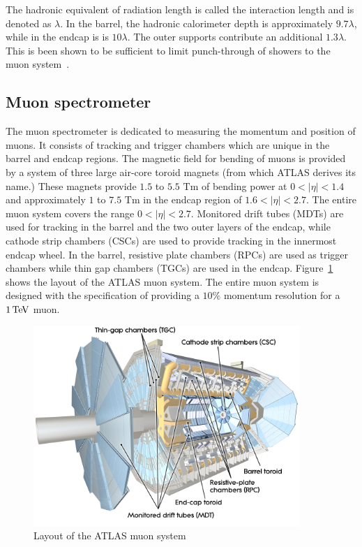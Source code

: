 The hadronic equivalent of radiation length is called the interaction length and is denoted as $\lambda$. In the barrel, the hadronic calorimeter depth is approximately $9.7\lambda$, while in the endcap is is $10\lambda$. The outer supports contribute an additional $1.3\lambda$. This is been shown to be sufficient to limit punch-through of showers to the muon system~\cite{ATLASPaper}.

\subsection{Muon spectrometer}

The muon spectrometer is dedicated to measuring the momentum and position of muons. It consists of tracking and trigger chambers which are unique in the barrel and endcap regions. The magnetic field for bending of muons is provided by a system of three large air-core toroid magnets (from which ATLAS derives its name.) These magnets provide $1.5$ to $5.5 \textrm{ Tm}$ of bending power at $0<|\eta|<1.4$ and approximately $1$ to $7.5 \textrm{ Tm}$ in the endcap region of $1.6 < |\eta| < 2.7$. The entire muon system covers the range $0 < |\eta|< 2.7$. Monitored drift tubes (MDTs) are used for tracking in the barrel and the two outer layers of the endcap, while cathode strip chambers (CSCs) are used to provide tracking in the innermost endcap wheel. In the barrel, resistive plate chambers (RPCs) are used as trigger chambers while thin gap chambers (TGCs) are used in the endcap. Figure~\ref{fig:ATLAS_muon} shows the layout of the ATLAS muon system. The entire muon system is designed with the specification of providing a $10\%$ momentum resolution for a $1 \TeV$ muon. 


\begin{figure}[h!]
  \centering
  \captionsetup{justification=centering}

  \includegraphics[width=0.9\textwidth]{figures/ATLAS_muon}
   \caption{Layout of the ATLAS muon system~\cite{ATLASPaper}}
  \label{fig:ATLAS_muon}
\end{figure}


